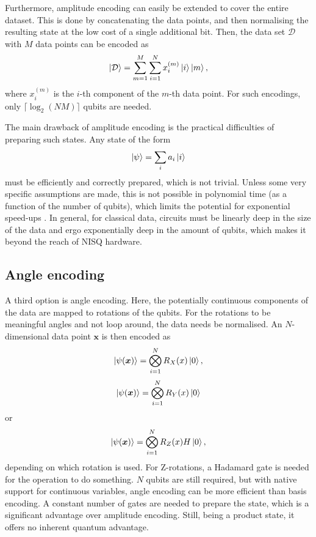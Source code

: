 Furthermore, amplitude encoding can easily be extended to cover the entire dataset. This is done by concatenating the data points, and then normalising the resulting state at the low cost of a single additional bit. Then, the data set $\mathcal{D}$ with $M$ data points can be encoded as
\begin{equation}
    \ket{\mathcal{D}} = \sum_{m=1}^M \sum_{i=1}^{N} x_i^{(m)} \ket{i} \ket{m},
\end{equation}
where $x_i^{(m)}$ is the $i$-th component of the $m$-th data point. For such encodings, only $\lceil \log_2 (N M) \rceil$ qubits are needed.

The main drawback of amplitude encoding is the practical difficulties of preparing such states. Any state of the form
\begin{equation}
    \ket{\psi} = \sum_{i} a_i \ket{i}
\end{equation}
must be efficiently and correctly prepared, which is not trivial. Unless some very specific assumptions are made, this is not possible in polynomial time (as a function of the number of qubits), which limits the potential for exponential speed-ups \cite{textbook}. In general, for classical data, circuits must be linearly deep in the size of the data and ergo exponentially deep in the amount of qubits, which makes it beyond the reach of NISQ hardware.

\subsection{Angle encoding}
A third option is angle encoding. Here, the potentially continuous components of the data are mapped to rotations of the qubits. For the rotations to be meaningful angles and not loop around, the data needs be normalised. An $N$-dimensional data point $\bm{x}$ is then encoded as
\begin{equation}
    \ket{\psi(\bm{x})} = \bigotimes_{i=1}^{N} R_X(x) \ket{0},
\end{equation}
\begin{equation}
    \ket{\psi(\bm{x})} = \bigotimes_{i=1}^{N} R_Y(x) \ket{0}
\end{equation}
or
\begin{equation}
    \ket{\psi(\bm{x})} = \bigotimes_{i=1}^{N} R_Z(x) H \ket{0},
\end{equation}
depending on which rotation is used. For Z-rotations, a Hadamard gate is needed for the operation to do something. $N$ qubits are still required, but with native support for continuous variables, angle encoding can be more efficient than basis encoding. A constant number of gates are needed to prepare the state, which is a significant advantage over amplitude encoding. Still, being a product state, it offers no inherent quantum advantage.


